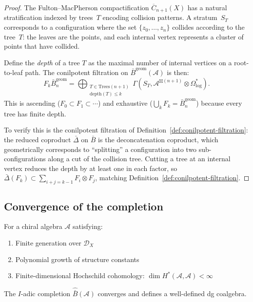 \begin{proof}
The Fulton--MacPherson compactification $\overline{C}_{n+1}(X)$ has a natural stratification indexed by trees~$T$ encoding collision patterns.  A stratum~$S_T$ corresponds to a configuration where the set $\{z_0, \ldots, z_n\}$ collides according to the tree~$T$: the leaves are the points, and each internal vertex represents a cluster of points that have collided.

Define the \emph{depth} of a tree $T$ as the maximal number of internal vertices on a root-to-leaf path.  The conilpotent filtration on $\bar{B}^{\mathrm{geom}}(\mathcal{A})$ is then:
\[
F_k \bar{B}^{\mathrm{geom}}_n = \bigoplus_{\substack{T \in \mathrm{Trees}(n+1) \\ \mathrm{depth}(T) \leq k}} \Gamma(S_T, \mathcal{A}^{\boxtimes(n+1)} \otimes \Omega^*_{\log}).
\]
This is ascending ($F_0 \subset F_1 \subset \cdots$) and exhaustive ($\bigcup_k F_k = \bar{B}^{\mathrm{geom}}_n$) because every tree has finite depth.

To verify this is the conilpotent filtration of Definition~\ref{def:conilpotent-filtration}: the reduced coproduct $\bar{\Delta}$ on $\bar{B}$ is the deconcatenation coproduct, which geometrically corresponds to ``splitting'' a configuration into two sub-configurations along a cut of the collision tree.  Cutting a tree at an internal vertex reduces the depth by at least one in each factor, so $\bar{\Delta}(F_k) \subset \sum_{i+j=k-1} F_i \otimes F_j$, matching Definition~\ref{def:conilpotent-filtration}.
\end{proof}

\subsection{Convergence of the completion}

\begin{theorem}\label{thm:completion-convergence}
For a chiral algebra $\mathcal{A}$ satisfying:
\begin{enumerate}
\item Finite generation over $\mathcal{D}_X$
\item Polynomial growth of structure constants
\item Finite-dimensional Hochschild cohomology: $\dim H^*(\mathcal{A}, \mathcal{A}) < \infty$
\end{enumerate}

The $I$-adic completion $\widehat{\bar{B}}(\mathcal{A})$ converges and defines a well-defined dg coalgebra.
\end{theorem}

